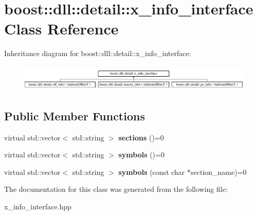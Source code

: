 \hypertarget{a01628}{}\section{boost\+:\+:dll\+:\+:detail\+:\+:x\+\_\+info\+\_\+interface Class Reference}
\label{a01628}
Inheritance diagram for boost\+:\+:dll\+:\+:detail\+:\+:x\+\_\+info\+\_\+interface\+:\begin{figure}[H]
\begin{center}
\leavevmode
\includegraphics[height=1.296296cm]{a01628}
\end{center}
\end{figure}
\subsection*{Public Member Functions}
\begin{DoxyCompactItemize}
\item 
\mbox{\label{a01628_a34d086805a08f646f9e10ef010e0b205}} 
virtual std\+::vector$<$ std\+::string $>$ {\bfseries sections} ()=0
\item 
\mbox{\label{a01628_ab6a8a24f236aafc5cdf8fa1b6ce61dab}} 
virtual std\+::vector$<$ std\+::string $>$ {\bfseries symbols} ()=0
\item 
\mbox{\label{a01628_acb39e3543f11831073b765b114864c97}} 
virtual std\+::vector$<$ std\+::string $>$ {\bfseries symbols} (const char $\ast$section\+\_\+name)=0
\end{DoxyCompactItemize}


The documentation for this class was generated from the following file\+:\begin{DoxyCompactItemize}
\item 
x\+\_\+info\+\_\+interface.\+hpp\end{DoxyCompactItemize}
